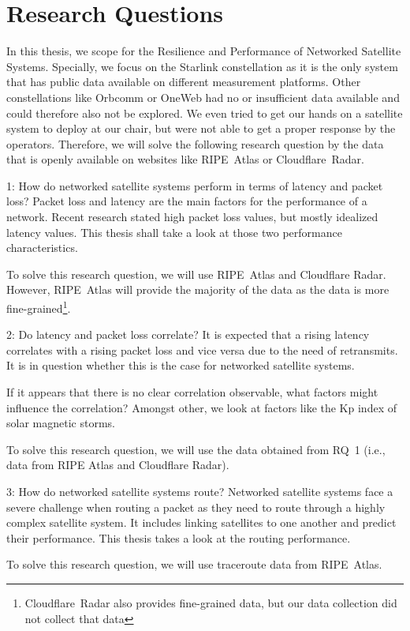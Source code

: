 \section{Research Questions} \label{sec:research-questions}

In this thesis, we scope for the Resilience and Performance of Networked
Satellite Systems. Specially, we focus on the Starlink constellation as it is
the only system that has public data available on different measurement
platforms. Other constellations like Orbcomm or OneWeb had no or insufficient
data available and could therefore also not be explored. We even tried to get
our hands on a satellite system to deploy at our chair, but were not able to
get a proper response by the operators. Therefore, we will solve the following
research question by the data that is openly available on websites like
RIPE~Atlas or Cloudflare~Radar.

\begin{rqbox}{1: How do networked satellite systems perform in terms of latency
		and packet loss?}
	Packet loss and latency are the main factors for the performance of a
	network. Recent research stated high packet loss values, but mostly
	idealized latency values. This thesis shall take a look at those two
	performance characteristics.

	To solve this research question, we will use RIPE~Atlas and Cloudflare
	Radar. However, RIPE~Atlas will provide the majority of the data as the
	data is more fine-grained\footnote{Cloudflare~Radar also provides
		fine-grained data, but our data collection did not collect that
		data}.
\end{rqbox}

\begin{rqbox}{2: Do latency and packet loss correlate?}
	It is expected that a rising latency correlates with a rising packet
	loss and vice versa due to the need of retransmits.
	It is in question whether this is the case for networked satellite
	systems.

	If it appears that there is no clear correlation observable, what
	factors might influence the correlation? Amongst other, we look at
	factors like the Kp index of solar magnetic storms.

	To solve this research question, we will use the data obtained from
	RQ~1 (i.e., data from RIPE Atlas and Cloudflare Radar).
\end{rqbox}

\begin{rqbox}{3: How do networked satellite systems route?}
	Networked satellite systems face a severe challenge when routing a
	packet as they need to route through a highly complex satellite system.
	It includes linking satellites to one another and predict their
	performance. This thesis takes a look at the routing performance.

	To solve this research question, we will use traceroute data from
	RIPE~Atlas.
\end{rqbox}
